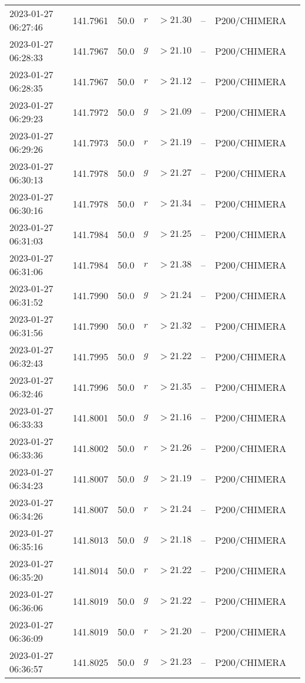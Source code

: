 \documentclass{nature_plusfigure}
\begin{document}
\begin{supplement}
\begin{center}
\begin{longtable}{llllllll}
2023-01-27 06:27:46 & 141.7961 & 50.0 & $r$ & $>21.30$ & -- & P200/CHIMERA &  \\ 
2023-01-27 06:28:33 & 141.7967 & 50.0 & $g$ & $>21.10$ & -- & P200/CHIMERA &  \\ 
2023-01-27 06:28:35 & 141.7967 & 50.0 & $r$ & $>21.12$ & -- & P200/CHIMERA &  \\ 
2023-01-27 06:29:23 & 141.7972 & 50.0 & $g$ & $>21.09$ & -- & P200/CHIMERA &  \\ 
2023-01-27 06:29:26 & 141.7973 & 50.0 & $r$ & $>21.19$ & -- & P200/CHIMERA &  \\ 
2023-01-27 06:30:13 & 141.7978 & 50.0 & $g$ & $>21.27$ & -- & P200/CHIMERA &  \\ 
2023-01-27 06:30:16 & 141.7978 & 50.0 & $r$ & $>21.34$ & -- & P200/CHIMERA &  \\ 
2023-01-27 06:31:03 & 141.7984 & 50.0 & $g$ & $>21.25$ & -- & P200/CHIMERA &  \\ 
2023-01-27 06:31:06 & 141.7984 & 50.0 & $r$ & $>21.38$ & -- & P200/CHIMERA &  \\ 
2023-01-27 06:31:52 & 141.7990 & 50.0 & $g$ & $>21.24$ & -- & P200/CHIMERA &  \\ 
2023-01-27 06:31:56 & 141.7990 & 50.0 & $r$ & $>21.32$ & -- & P200/CHIMERA &  \\ 
2023-01-27 06:32:43 & 141.7995 & 50.0 & $g$ & $>21.22$ & -- & P200/CHIMERA &  \\ 
2023-01-27 06:32:46 & 141.7996 & 50.0 & $r$ & $>21.35$ & -- & P200/CHIMERA &  \\ 
2023-01-27 06:33:33 & 141.8001 & 50.0 & $g$ & $>21.16$ & -- & P200/CHIMERA &  \\ 
2023-01-27 06:33:36 & 141.8002 & 50.0 & $r$ & $>21.26$ & -- & P200/CHIMERA &  \\ 
2023-01-27 06:34:23 & 141.8007 & 50.0 & $g$ & $>21.19$ & -- & P200/CHIMERA &  \\ 
2023-01-27 06:34:26 & 141.8007 & 50.0 & $r$ & $>21.24$ & -- & P200/CHIMERA &  \\ 
2023-01-27 06:35:16 & 141.8013 & 50.0 & $g$ & $>21.18$ & -- & P200/CHIMERA &  \\ 
2023-01-27 06:35:20 & 141.8014 & 50.0 & $r$ & $>21.22$ & -- & P200/CHIMERA &  \\ 
2023-01-27 06:36:06 & 141.8019 & 50.0 & $g$ & $>21.22$ & -- & P200/CHIMERA &  \\ 
2023-01-27 06:36:09 & 141.8019 & 50.0 & $r$ & $>21.20$ & -- & P200/CHIMERA &  \\ 
2023-01-27 06:36:57 & 141.8025 & 50.0 & $g$ & $>21.23$ & -- & P200/CHIMERA &  \\ 

\end{longtable}
\end{center}
\end{supplement}
\end{document}

